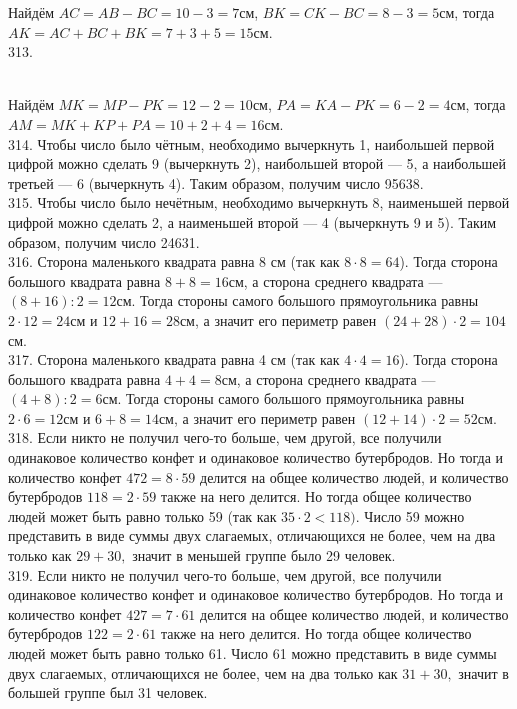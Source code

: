 \documentclass[12pt]{article}
\begin{document}
Найдём $AC=AB-BC=10-3=7$см, $BK=CK-BC=8-3=5$см, тогда $AK=AC+BC+BK=7+3+5=15$см.\\
313. \begin{figure}[ht!]
\end{figure}\\
Найдём $MK=MP-PK=12-2=10$см, $PA=KA-PK=6-2=4$см, тогда $AM=MK+KP+PA=10+2+4=16$см.\\
314. Чтобы число было чётным, необходимо вычеркнуть 1, наибольшей первой цифрой можно сделать 9 (вычеркнуть 2), наибольшей второй --- 5, а наибольшей третьей --- 6 (вычеркнуть 4). Таким образом, получим число 95638.\\
315. Чтобы число было нечётным, необходимо вычеркнуть 8, наименьшей первой цифрой можно сделать 2, а наименьшей второй --- 4 (вычеркнуть 9 и 5). Таким образом, получим число 24631.\\
316. Сторона маленького квадрата равна 8 см (так как $8\cdot8=64$). Тогда сторона большого квадрата равна $8+8=16$см, а сторона среднего квадрата --- $(8+16):2=12$см. Тогда стороны самого большого прямоугольника равны $2\cdot12=24$см и $12+16=28$см, а значит его периметр равен $(24+28)\cdot2=104$см.\\
317. Сторона маленького квадрата равна 4 см (так как $4\cdot4=16$). Тогда сторона большого квадрата равна $4+4=8$см, а сторона среднего квадрата --- $(4+8):2=6$см. Тогда стороны самого большого прямоугольника равны $2\cdot6=12$см и $6+8=14$см, а значит его периметр равен $(12+14)\cdot2=52$см.\\
318. Если никто не получил чего-то больше, чем другой, все получили одинаковое количество конфет и одинаковое количество бутербродов. Но тогда и количество конфет $472=8\cdot59$ делится на общее количество людей, и количество бутербродов $118=2\cdot59$ также на него делится. Но тогда общее количество людей может быть равно только 59 (так как $35\cdot2<118).$ Число 59 можно представить в виде суммы двух слагаемых, отличающихся не более, чем на два только как $29+30,$ значит в меньшей группе было 29 человек.\\
319. Если никто не получил чего-то больше, чем другой, все получили одинаковое количество конфет и одинаковое количество бутербродов. Но тогда и количество конфет $427=7\cdot61$ делится на общее количество людей, и количество бутербродов $122=2\cdot61$ также на него делится. Но тогда общее количество людей может быть равно только 61.  Число 61 можно представить в виде суммы двух слагаемых, отличающихся не более, чем на два только как $31+30,$ значит в большей группе был 31 человек.\\
\end{document}
